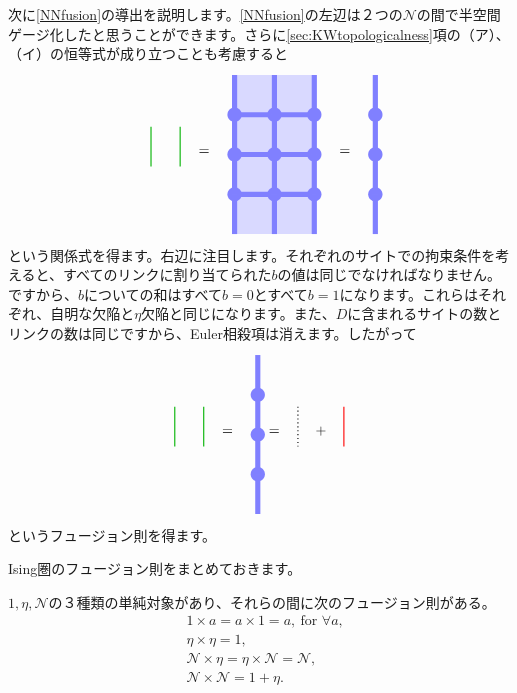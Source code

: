 \documentclass[report,paper=a4, fontsize=12pt, line_length=16cm, number_of_lines=33,dvipdfmx]{jlreq}
\numberwithin{equation}{chapter}
\newcommand{\Ncal}{\mathcal{N}}
\newcommand{\idline}{
  \quad \tikz[baseline=0.3cm]{
    \draw[thick,dotted](0,1)--(0,0);
   }\quad   
}
\newcommand{\etaline}{
  \quad \tikz[baseline=0.3cm]{
    \draw[thick,red](0,1)--(0,0);
   }\quad   
}
\newcommand{\KWline}{
  \quad \tikz[baseline=0.3cm]{
    \draw[thick,darkgreen](0,1)--(0,0);
   }\quad 
}
\begin{document}
次に\eqref{NNfusion}の導出を説明します。\eqref{NNfusion}の左辺は２つの$\Ncal$の間で半空間ゲージ化したと思うことができます。さらに\ref{sec:KWtopologicalness}項の（ア）、（イ）の恒等式が成り立つことも考慮すると
\begin{align}
  \KWline \KWline = \quad
  \begin{tikzpicture}[baseline=0cm]
    \foreach \x in {0,1}{
        \foreach \y in {-2,-1,...,1}{
        \fill[plaqblue](\x,\y) rectangle (\x+1,\y+1);
        }
    }
    \foreach \x in {0,1,2}{
        \foreach \y in {-1,0,1}{
            \fill[linkblue] (\x,\y) circle (1.8mm);
        }
    }
    \foreach \x in {0,1}{
        \foreach \y in {-1,0,1}{
            \draw[linkblue, line width = 1.3mm](\x,\y)--(\x + 1,\y);
        }
    }
    \foreach \x in {0,1,2}{
        \foreach \y in {-2,-1,...,1}{
            \draw[linkblue, line width = 1.3mm](\x,\y)--(\x,\y + 1);
        }
    }
\end{tikzpicture}
\quad
=
\quad
\begin{tikzpicture}[baseline=0cm]
    \foreach \x in {0}{
        \foreach \y in {-1,0,1}{
            \fill[linkblue] (\x,\y) circle (1.8mm);
        }
    }
    \foreach \x in {0}{
        \foreach \y in {-2,-1,...,1}{
            \draw[linkblue, line width = 1.3mm](\x,\y)--(\x,\y + 1);
        }
    }
\end{tikzpicture}
\end{align}
という関係式を得ます。右辺に注目します。それぞれのサイトでの拘束条件を考えると、すべてのリンクに割り当てられた$b$の値は同じでなければなりません。ですから、$b$についての和はすべて$b=0$とすべて$b=1$になります。これらはそれぞれ、自明な欠陥と$\eta$欠陥と同じになります。また、$D$に含まれるサイトの数とリンクの数は同じですから、Euler相殺項は消えます。したがって
\begin{align}
  \KWline \KWline
=
\quad
\begin{tikzpicture}[baseline=0cm]
    \foreach \x in {0}{
        \foreach \y in {-1,0,1}{
            \fill[linkblue] (\x,\y) circle (1.8mm);
        }
    }
    \foreach \x in {0}{
        \foreach \y in {-2,-1,...,1}{
            \draw[linkblue, line width = 1.3mm](\x,\y)--(\x,\y + 1);
        }
    }
\end{tikzpicture}
= \idline + \etaline
\end{align}
というフュージョン則を得ます。

Ising圏のフュージョン則をまとめておきます。
\begin{emphasize}
  $1,\eta,\Ncal$の３種類の単純対象があり、それらの間に次のフュージョン則がある。
  \begin{align}
    &1\times a = a\times 1 = a,\ \text{for } \forall a,\\
    &\eta \times \eta =1,\\
    &\Ncal \times \eta =\eta \times \Ncal =\Ncal,\\
    &\Ncal \times \Ncal = 1 + \eta.
  \end{align}
\end{emphasize}
\end{document}
